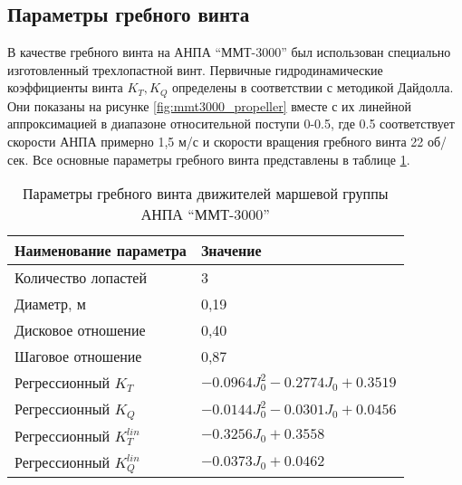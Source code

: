 

\subsection{Параметры гребного винта}
В качестве гребного винта на АНПА ``ММТ-3000'' был использован специально изготовленный трехлопастной винт.
Первичные гидродинамические коэффициенты винта $K_T, K_Q$ определены в соответствии с методикой Дайдолла.
Они показаны на рисунке \ref{fig:mmt3000_propeller} вместе с их линейной аппроксимацией в диапазоне относительной поступи 0-0.5, где 0.5 соответствует скорости АНПА примерно 1,5 м/с и скорости вращения гребного винта 22 об/сек.
Все основные параметры гребного винта представлены в таблице \ref{tab:mmt3000_propeller}.

\begin{table}
    \caption{Параметры гребного винта движителей маршевой группы АНПА ``ММТ-3000''
    }
    \label{tab:mmt3000_propeller}
    \centering
    \begin{tabular}{ll}
        \toprule
        Наименование параметра  & Значение\\
        \midrule
        Количество лопастей & 3 \\
        Диаметр, м & 0,19 \\
        Дисковое отношение & 0,40 \\
        Шаговое отношение & 0,87 \\
        Регрессионный $K_T$ & $-0.0964J_0^2 -0.2774J_0 + 0.3519$ \\
        Регрессионный $K_Q$ & $-0.0144J_0^2 -0.0301J_0 + 0.0456$ \\
        Регрессионный $K_T^{lin}$ & $-0.3256J_0 + 0.3558$ \\
        Регрессионный $K_Q^{lin}$ & $-0.0373J_0 + 0.0462$ \\
        \bottomrule
    \end{tabular}
\end{table}

